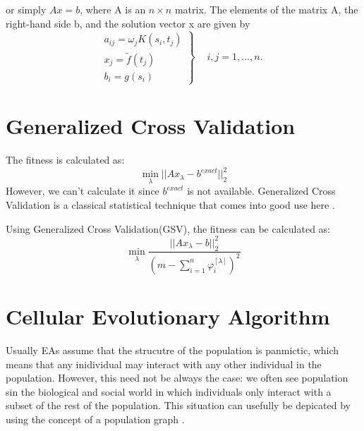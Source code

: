 \documentclass{article}
\begin{document}
or simply \(Ax=b\), where A is an \(n \times n\) matrix. The elements of the
matrix A, the right-hand side b, and the solution vector x are given by
\begin{equation}
\left. {\begin{array}{*{20}{c}}
{{a_{ij}} = {\omega _j}K({s_i},{t_j})}\\
{{x_j} = \tilde f({t_j})}\\
{{b_i} = g({s_i})}
\end{array}} \right\}\begin{array}{*{20}{c}}
{}&{i,j = 1,...,n.}
\end{array}
\end{equation}

\section{Generalized Cross Validation}
The fitness is calculated as:
\begin{equation}
	\mathop {\min }\limits_\lambda  ||A{x_\lambda } - {b^{exact}}||_2^2
\end{equation}
However, we can't calculate it since \(b^{exact}\) is not available. Generalized 
Cross Validation is a classical statistical technique that comes into good use
here \cite{hansen2010discrete}.

Using Generalized Cross Validation(GSV), the fitness can be calculated as:
\begin{equation}
	\mathop {\min }\limits_\lambda  \frac{{||A{x_\lambda } - b||_2^2}}{{{{(m -
	\sum\nolimits_{i = 1}^n {\varphi _i^{[\lambda ]}} )}^2}}}
	\label{eq:disintegral}
\end{equation}


\section{Cellular Evolutionary Algorithm}
Usually EAs assume that the strucutre of the population is panmictic, which
means that any inidividual may interact with any other individual in the
population.
However, this need not be always the case: we often see population sin the
biological and social world in which individuals only interact with a subset of
the rest of the population. This situation can usefully be depicated by using
the concept of a population graph \cite{hoekstra2010simulating}.
\end{document}
